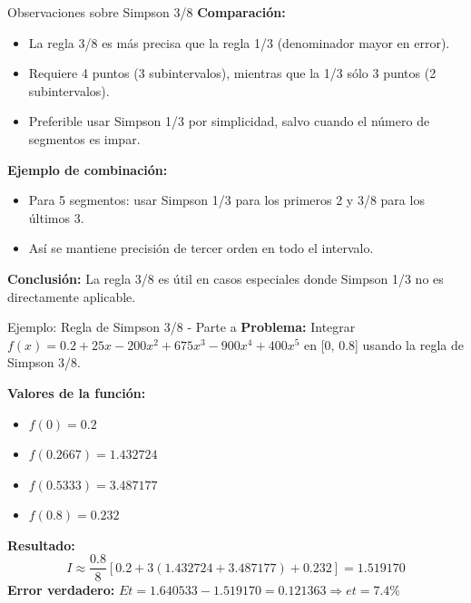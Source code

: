 \documentclass[main.tex]{subfiles}
\begin{document}
\begin{frame}{Observaciones sobre Simpson 3/8}
\textbf{Comparación:}
\begin{itemize}
  \item La regla 3/8 es más precisa que la regla 1/3 (denominador mayor en error).
  \item Requiere 4 puntos (3 subintervalos), mientras que la 1/3 sólo 3 puntos (2 subintervalos).
  \item Preferible usar Simpson 1/3 por simplicidad, salvo cuando el número de segmentos es impar.
\end{itemize}

\textbf{Ejemplo de combinación:}
\begin{itemize}
  \item Para 5 segmentos: usar Simpson 1/3 para los primeros 2 y 3/8 para los últimos 3.
  \item Así se mantiene precisión de tercer orden en todo el intervalo.
\end{itemize}

\textbf{Conclusión:} La regla 3/8 es útil en casos especiales donde Simpson 1/3 no es directamente aplicable.
\end{frame}
\begin{frame}{Ejemplo: Regla de Simpson 3/8 - Parte a}
\textbf{Problema:} Integrar \( f(x) = 0.2 + 25x - 200x^2 + 675x^3 - 900x^4 + 400x^5 \) en [0, 0.8] usando la regla de Simpson 3/8.

\textbf{Valores de la función:}
\begin{itemize}
  \item \( f(0) = 0.2 \)
  \item \( f(0.2667) = 1.432724 \)
  \item \( f(0.5333) = 3.487177 \)
  \item \( f(0.8) = 0.232 \)
\end{itemize}

\textbf{Resultado:}
\[
I \approx \frac{0.8}{8} [0.2 + 3(1.432724 + 3.487177) + 0.232] = 1.519170
\]
\textbf{Error verdadero:} \( Et = 1.640533 - 1.519170 = 0.121363 \Rightarrow et = 7.4\% \)
\end{frame}
\end{document}
